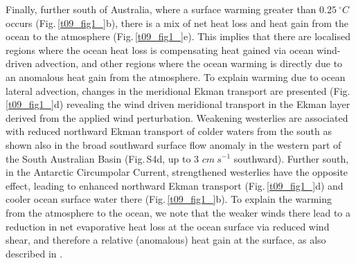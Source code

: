 \documentclass[draft,linenumbers]{agujournal2018}
\begin{document}
Finally, further south of Australia, where a surface warming greater than $0.25\ ^{\circ}C$ occurs (Fig.\,\ref{t09_fig1_}b), there is a mix of net heat loss and heat gain from the ocean to the atmosphere (Fig.\,\ref{t09_fig1_}e). This implies that there are localised regions where the ocean heat loss is compensating heat gained via ocean wind-driven advection, and other regions where the ocean warming is directly due to an anomalous heat gain from the atmosphere. To explain warming due to ocean lateral advection, changes in the meridional Ekman transport are presented (Fig.\,\ref{t09_fig1_}d) revealing the wind driven meridional transport in the Ekman layer derived from the applied wind perturbation. Weakening westerlies are associated with reduced northward Ekman transport of colder waters from the south \citep{SenGupta2006} as shown also in the broad southward surface flow anomaly in the western part of the South Australian Basin (Fig.\,S4d, up to 3 $cm\ s^{-1}$ southward). Further south, in the Antarctic Circumpolar Current, strengthened westerlies have the opposite effect, leading to enhanced northward Ekman transport (Fig.\,\ref{t09_fig1_}d) and cooler ocean surface water there (Fig.\,\ref{t09_fig1_}b). To explain the warming from the atmosphere to the ocean, we note that the weaker winds there lead to a reduction in net evaporative heat loss at the ocean surface via reduced wind shear, and therefore a relative (anomalous) heat gain at the surface, as also described in \citet{SenGupta2006}. 
\end{document}
